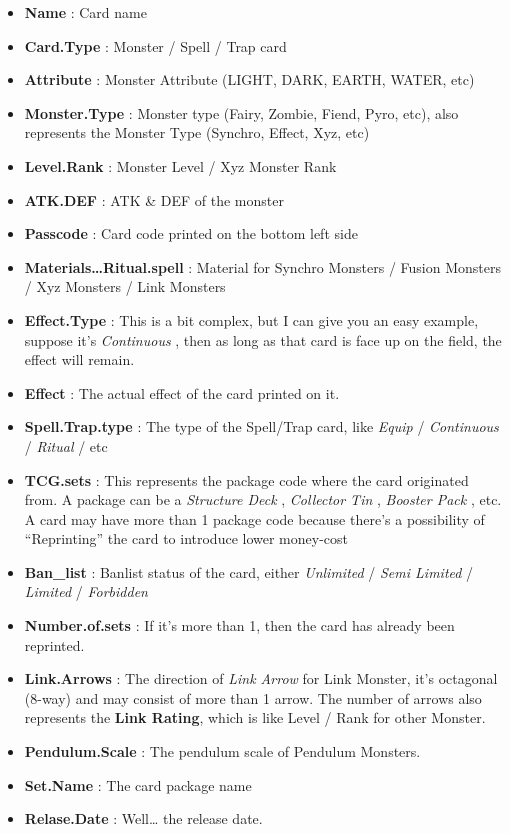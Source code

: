 \documentclass[
]{article}
\providecommand{\tightlist}{%
  \setlength{\itemsep}{0pt}\setlength{\parskip}{0pt}}
\begin{document}
\begin{itemize}
\tightlist
\item
  \textbf{Name} : Card name
\item
  \textbf{Card.Type} : Monster / Spell / Trap card
\item
  \textbf{Attribute} : Monster Attribute (LIGHT, DARK, EARTH, WATER,
  etc)
\item
  \textbf{Monster.Type} : Monster type (Fairy, Zombie, Fiend, Pyro,
  etc), also represents the Monster Type (Synchro, Effect, Xyz, etc)
\item
  \textbf{Level.Rank} : Monster Level / Xyz Monster Rank
\item
  \textbf{ATK.DEF} : ATK \& DEF of the monster
\item
  \textbf{Passcode} : Card code printed on the bottom left side
\item
  \textbf{Materials\ldots Ritual.spell} : Material for Synchro Monsters
  / Fusion Monsters / Xyz Monsters / Link Monsters
\item
  \textbf{Effect.Type} : This is a bit complex, but I can give you an
  easy example, suppose it's \emph{Continuous} , then as long as that
  card is face up on the field, the effect will remain.
\item
  \textbf{Effect} : The actual effect of the card printed on it.
\item
  \textbf{Spell.Trap.type} : The type of the Spell/Trap card, like
  \emph{Equip} / \emph{Continuous} / \emph{Ritual} / etc
\item
  \textbf{TCG.sets} : This represents the package code where the card
  originated from. A package can be a \emph{Structure Deck} ,
  \emph{Collector Tin} , \emph{Booster Pack} , etc. A card may have more
  than 1 package code because there's a possibility of ``Reprinting''
  the card to introduce lower money-cost
\item
  \textbf{Ban\_list} : Banlist status of the card, either
  \emph{Unlimited} / \emph{Semi Limited} / \emph{Limited} /
  \emph{Forbidden}
\item
  \textbf{Number.of.sets} : If it's more than 1, then the card has
  already been reprinted.
\item
  \textbf{Link.Arrows} : The direction of \emph{Link Arrow} for Link
  Monster, it's octagonal (8-way) and may consist of more than 1 arrow.
  The number of arrows also represents the \textbf{Link Rating}, which
  is like Level / Rank for other Monster.
\item
  \textbf{Pendulum.Scale} : The pendulum scale of Pendulum Monsters.
\item
  \textbf{Set.Name} : The card package name
\item
  \textbf{Relase.Date} : Well\ldots{} the release date.
\end{itemize}
\end{document}
